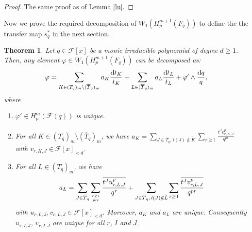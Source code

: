 \documentclass[times,10pt]{amsart}
\newcommand{\dd}{{\rm d}}
\newcommand{\F}{\ensuremath{\mathcal{F}}}
\renewcommand{\phi}{\varphi}
\newtheorem{thm}{Theorem}[section]
\begin{document}
    \begin{proof} {The same proof as {of} Lemma} \ref{lu}.
    \end{proof}



Now we prove the required  decomposition of $W_1(H_p^{m+1}(F_q))$    to define the  the transfer map $s_q^*$ in the next section.
\begin{thm}\label{thd3}
     Let $q\in\F[x]$ be a monic irreducible polynomial of degree $d\geq 1$.   Then, any element  $\phi\in W_1(H_p^{m+1}(F_q))$ can be  decomposed as:
     \begin{align*}
         \phi= \sum_{K\in (T_q)_m\setminus (\overline{T}_q)_m} a_K \frac{\dd t_K}{t_K}+ \sum_{L\in (\overline{T}_q)_m} a_L \frac{\dd t_L}{t_L}+ \phi'\wedge \frac{\dd q}{q},
     \end{align*} where 
     \begin{enumerate}
     \item $\phi'\in H_p^m(\F(q))$ is unique.
         \item   For all $K\in (T_q)_m\setminus (\overline{T}_q)_m$, we have $  a_K= \displaystyle{{\sum\limits_{J\in \overline{T}_q, \,l(J)\notin \tilde{K}}} \sum\limits_{r\geq 1 } \frac{ \overline{t^J v^p_{r,K,J}}}{ q^{pr}}}$ with $v_{r,K,J}\in \F[x]_{<d}$.

         \item  For all $L\in (\overline{T}_q)_m$, we have  $$ a_L= \sum\limits_{J\in  \overline{T}_q } \sum\limits_{r\geq 1\atop p\nmid r} \frac{ \overline{t^{J} u^p_{r,L,J}}}{ q^r}+ {\sum_{ J\in \overline{T}_q,\, l(J)\notin \tilde{L}}}\sum_{r\geq 1}\frac{\overline{t^J v^p_{r,L,J}}}{ q^{pr}} $$ with  $u_{r,L,J}, v_{r,L,J}\in \F[x]_{<d}$. Moreover,  $a_K$ and $a_L$ are unique.  Consequently  $u_{r,I,J}$, $v_{r,I,J}$ are unique for all $r$, $I$ and $J$.
     \end{enumerate}
\end{thm}
\end{document}
